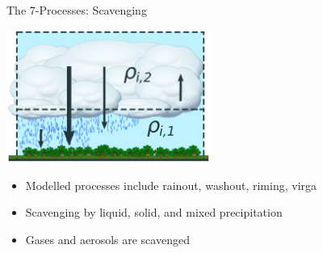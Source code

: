 \documentclass[10pt]{beamer}
\begin{document}
\begin{frame}[fragile]{The 7-Processes: Scavenging}
    \begin{center}
    \includegraphics[width=0.5\textwidth]{box-model-scav.eps}
    \end{center}
    \begin{itemize}
        \item Modelled processes include rainout, washout, riming, virga
        \item Scavenging by liquid, solid, and mixed precipitation
        \item Gases and aerosols are scavenged
    \end{itemize}
\end{frame}
\end{document}
